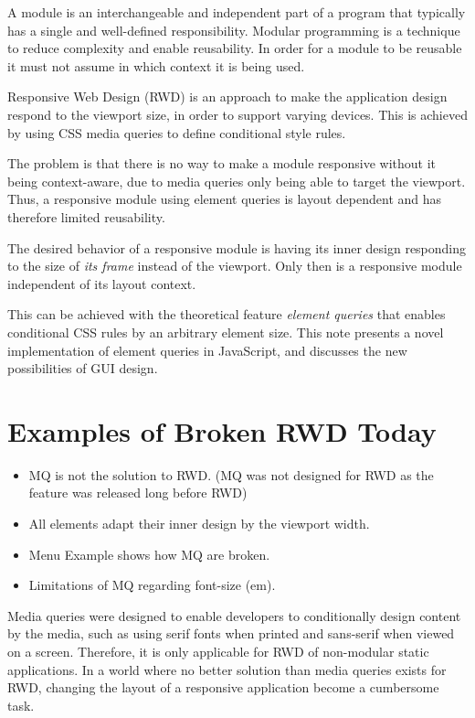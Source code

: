 \documentclass{sigchi}
\begin{document}
  A module is an interchangeable and independent part of a program that typically has a single and well-defined responsibility.
  Modular programming is a technique to reduce complexity and enable reusability.
  In order for a module to be reusable it must not assume in which context it is being used.

  Responsive Web Design (RWD) is an approach to make the application design respond to the viewport size, in order to support varying devices.
  This is achieved by using CSS media queries to define conditional style rules.

  The problem is that there is no way to make a module responsive without it being context-aware, due to media queries only being able to target the viewport.
  Thus, a responsive module using element queries is layout dependent and has therefore limited reusability.

  The desired behavior of a responsive module is having its inner design responding to the size of \emph{its frame} instead of the viewport.
  Only then is a responsive module independent of its layout context.

  This can be achieved with the theoretical feature \emph{element queries} that enables conditional CSS rules by an arbitrary element size.
  This note presents a novel implementation of element queries in JavaScript, and discusses the new possibilities of GUI design.

\section{Examples of Broken RWD Today}
  \begin{itemize}
    \item MQ is not the solution to RWD. (MQ was not designed for RWD as the feature was released long before RWD)
    \item All elements adapt their inner design by the viewport width.
    \item Menu Example shows how MQ are broken.
    \item Limitations of MQ regarding font-size (em).
  \end{itemize}

  Media queries were designed to enable developers to conditionally design content by the media, such as using serif fonts when printed and sans-serif when viewed on a screen.
  Therefore, it is only applicable for RWD of non-modular static applications.
  In a world where no better solution than media queries exists for RWD, changing the layout of a responsive application become a cumbersome task.
  
\end{document}
